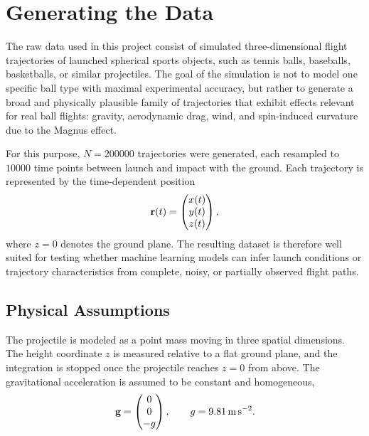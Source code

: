 \section{Generating the Data \label{sec:data}}

The raw data used in this project consist of simulated three-dimensional flight trajectories of launched spherical sports objects, such as tennis balls, baseballs, basketballs, or similar projectiles.
The goal of the simulation is not to model one specific ball type with maximal experimental accuracy, but rather to generate a broad and physically plausible family of trajectories that exhibit effects relevant for real ball flights: gravity, aerodynamic drag, wind, and spin-induced curvature due to the Magnus effect.\cite{mehta1985aerodynamics}\cite{goff2009trajectory}

For this purpose, $N=200000$ trajectories were generated, each resampled to $10000$ time points between launch and impact with the ground.
Each trajectory is represented by the time-dependent position
\begin{equation*}
    \vb{r}(t) = \begin{pmatrix}
        x(t) \\ y(t) \\ z(t)
    \end{pmatrix},
\end{equation*}
where $z=0$ denotes the ground plane.
The resulting dataset is therefore well suited for testing whether machine learning models can infer launch conditions or trajectory characteristics from complete, noisy, or partially observed flight paths.

\subsection{Physical Assumptions}

The projectile is modeled as a point mass moving in three spatial dimensions.
The height coordinate $z$ is measured relative to a flat ground plane, and the integration is stopped once the projectile reaches $z=0$ from above.
The gravitational acceleration is assumed to be constant and homogeneous,
\begin{equation*}
    \vb{g} = \begin{pmatrix}
        0 \\ 0 \\ -g
    \end{pmatrix},
    \qquad
    g = \SI{9.81}{\meter\per\second\squared}.
\end{equation*}

